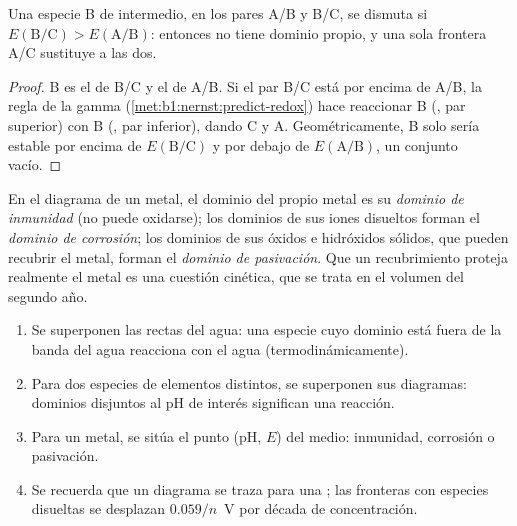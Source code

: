 \begin{proposition}\label{prop:b1:e-ph-diagrams:disproportionation-criterion}
Una especie B de  intermedio, en los pares A/B y B/C,
se dismuta si $E(\mathrm{B}/\mathrm{C}) > E(\mathrm{A}/\mathrm{B})$:
entonces no tiene dominio propio, y una sola frontera A/C sustituye a las
dos.
\end{proposition}

\begin{proof}
B es el  de B/C y el  de A/B. Si el par B/C está por
encima de A/B, la regla de la gamma (\cref{met:b1:nernst:predict-redox})
hace reaccionar B (, par superior) con B (, par
inferior), dando C y A. Geométricamente, B solo sería estable por encima
de $E(\mathrm{B}/\mathrm{C})$ y por debajo de $E(\mathrm{A}/\mathrm{B})$,
un conjunto vacío.
\end{proof}

\begin{definition}\label{def:b1:e-ph-diagrams:corrosion-domains}
En el diagrama de un metal, el dominio del propio metal es su
\emph{dominio de inmunidad} (no puede
oxidarse); los dominios de sus iones disueltos forman el \emph{dominio de
corrosión}; los dominios de sus óxidos e
hidróxidos sólidos, que pueden recubrir el metal, forman el
\emph{dominio de pasivación}. Que un
recubrimiento proteja realmente el metal es una cuestión cinética, que se
trata en el volumen del segundo año.
\end{definition}

\begin{method}\label{met:b1:e-ph-diagrams:read}
\begin{enumerate}
  \item Se superponen las rectas del agua: una especie cuyo dominio está
        fuera de la banda del agua reacciona con el agua
        (termodinámicamente).
  \item Para dos especies de elementos distintos, se superponen sus
        diagramas: dominios disjuntos al pH de interés significan una
        reacción.
  \item Para un metal, se sitúa el punto (pH, $E$) del medio: inmunidad,
        corrosión o pasivación.
  \item Se recuerda que un diagrama se traza para una ; las fronteras con especies disueltas se desplazan
        $0.059/n$~V por década de concentración.
\end{enumerate}
\end{method}

